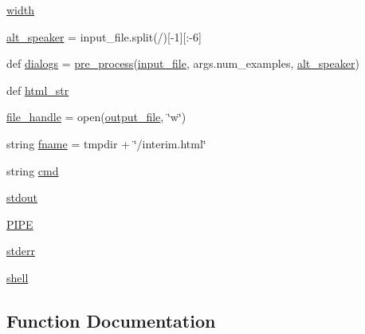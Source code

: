 \begin{DoxyCompactItemize}
\item 
\hyperlink{namespaceparlai_1_1scripts_1_1convo__render_a9781c43527eb370030ea6f1cafca6a3a}{width}
\item 
\hyperlink{namespaceparlai_1_1scripts_1_1convo__render_a516a38b04ed5b7cf0c03ed2ea0e99d46}{alt\+\_\+speaker} = input\+\_\+file.\+split(\textquotesingle{}/\textquotesingle{})\mbox{[}-\/1\mbox{]}\mbox{[}\+:-\/6\mbox{]}
\item 
def \hyperlink{namespaceparlai_1_1scripts_1_1convo__render_afbcbefbded116f916dd045b2042074c2}{dialogs} = \hyperlink{namespaceparlai_1_1scripts_1_1convo__render_a0f0a031443ca797c936d2961a702a45e}{pre\+\_\+process}(\hyperlink{namespaceparlai_1_1scripts_1_1convo__render_a708724a5430d3e0236e76dc23ed66801}{input\+\_\+file}, args.\+num\+\_\+examples, \hyperlink{namespaceparlai_1_1scripts_1_1convo__render_a516a38b04ed5b7cf0c03ed2ea0e99d46}{alt\+\_\+speaker})
\item 
def \hyperlink{namespaceparlai_1_1scripts_1_1convo__render_ad86fd6b2d673ad833c55444081f1aa2d}{html\+\_\+str}
\item 
\hyperlink{namespaceparlai_1_1scripts_1_1convo__render_aaf6f8cf81ac771e9724478dd77c5b82b}{file\+\_\+handle} = open(\hyperlink{namespaceparlai_1_1scripts_1_1convo__render_ad3c1d6fa9a8463d68b415f7a995db518}{output\+\_\+file}, \char`\"{}w\char`\"{})
\item 
string \hyperlink{namespaceparlai_1_1scripts_1_1convo__render_afdeec635d90f882f6f9c117a9cf62010}{fname} = tmpdir + \char`\"{}/interim.\+html\char`\"{}
\item 
string \hyperlink{namespaceparlai_1_1scripts_1_1convo__render_a6fdef78374ed4101104137135c6764a7}{cmd}
\item 
\hyperlink{namespaceparlai_1_1scripts_1_1convo__render_a2edb183bdab922bf3744aecb1430986e}{stdout}
\item 
\hyperlink{namespaceparlai_1_1scripts_1_1convo__render_a5841ebb3312b58c9ee1897a8a0eaa656}{P\+I\+PE}
\item 
\hyperlink{namespaceparlai_1_1scripts_1_1convo__render_a85d611f68ace84c18e093f6924395a11}{stderr}
\item 
\hyperlink{namespaceparlai_1_1scripts_1_1convo__render_a16ca84216f37d875ce873f3d693bc76a}{shell}
\end{DoxyCompactItemize}


\subsection{Function Documentation}
\mbox{\label{namespaceparlai_1_1scripts_1_1convo__render_ac7e3c84a7f6e3b488360319b597eda18}} 
